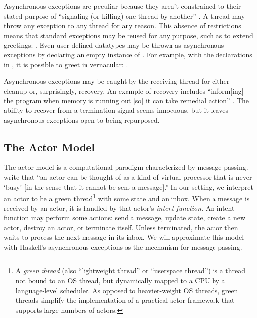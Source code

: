 \documentclass[sigplan,screen]{acmart}
\begin{document}
Asynchronous exceptions are peculiar because they aren't constrained to their
stated purpose of ``signaling (or killing) one
thread by another'' \cite{marlow2001async}.
%
A thread may throw any exception to any thread for any reason.
%
This absence of restrictions means that standard exceptions may be reused for
any purpose, such as to extend greetings:
.
%
Even
user-defined datatypes may be thrown as asynchronous exceptions by
declaring an empty instance of  \cite{marlow2006extensible}.
%
For example, with the declarations in , it is possible to greet
in vernacular: .

Asynchronous exceptions may be caught by the receiving thread for
either cleanup or, surprisingly, recovery.
%
An example of recovery includes ``inform[ing] the program when memory is
running out [so] it can take remedial action'' \cite{marlow2001async}.
%
The ability to recover from a termination signal seems innocuous, but
it leaves asynchronous exceptions open to being repurposed.

\subsection{The Actor Model}
\label{sec:actor-model}

The actor model is a computational paradigm characterized by message passing.
%
\citet{hewitt1973actors} write that ``an actor can be thought of as a kind of
virtual processor that is never `busy' [in the sense that it cannot be sent a
message].''
%
In our setting, we interpret an actor to be a green thread\footnote{
    A \emph{green thread} (also ``lightweight thread'' or ``userspace thread'')
    is a thread not bound to an OS thread, but dynamically mapped to a CPU by a
    language-level scheduler.
    As opposed to heavier-weight OS threads, green threads simplify the implementation of a practical actor framework that supports large numbers of actors.
} with some state and an inbox.
%
When a message is received by an actor,
it is handled by that actor's \emph{intent function}.
%
An intent function may perform some actions:
send a message, update state, create a new actor, destroy an actor, or
terminate itself.
%
Unless terminated, the actor then waits to process the next message in its
inbox.
%
We will approximate this model with Haskell's asynchronous exceptions as the
mechanism for message passing.
\end{document}
